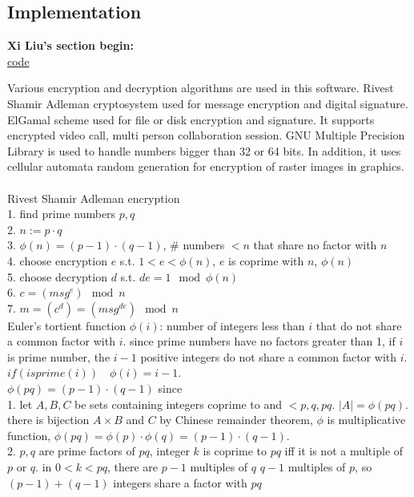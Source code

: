 \documentclass[12pt, border = 4pt, multi]{article} %
\begin{document}
\subsection*{Implementation}
\textbf{Xi Liu's section begin:}\\
\href{https://github.com/xi-liu-cs/2022-summer/tree/main/cryptography/hw/6}{code}
\begin{multicols}{2}
\noindent 
Various encryption and decryption algorithms are used in this software. Rivest Shamir Adleman cryptosystem used for message encryption and digital signature. ElGamal scheme used for file or disk encryption and signature. It supports encrypted video call, multi person collaboration session. GNU Multiple Precision Library is used to handle numbers bigger than 32 or 64 bits. In addition, it uses cellular automata random generation for encryption of raster images in graphics.\\
\\
Rivest Shamir Adleman encryption\\
1. find prime numbers $p, q$\\
2. $n := p \cdot q$\\
3. $\phi(n) = (p - 1) \cdot (q - 1)$, \# numbers $< n$ that share no factor with $n$\\
4. choose encryption $e$ s.t. $1 < e < \phi(n)$, $e$ is coprime with $n$, $\phi(n)$\\
5. choose decryption $d$ s.t. $de = 1 \mod \phi(n)$\\
6. $c = (msg ^ e) \mod n$\\
7. $m = (c ^ d) = (msg ^ {de}) \mod n$\\
Euler's tortient function $\phi(i)$: number of integers less than $i$ that do not share a common factor with $i$. since prime numbers have no factors greater than 1,
if $i$ is prime number, the $i - 1$ positive integers do not share a common factor with $i$. $if(isprime(i))\quad\phi(i) = i - 1$.\\
$\phi(pq) = (p - 1) \cdot (q - 1)$ since\\ 
1. let $A, B, C$ be sets containing integers coprime to and $< p, q, pq$. $|A| =
\phi(pq)$. there is bijection $A \times B$ and $C$ by Chinese remainder theorem, $\phi$ is multiplicative function, $\phi(pq) = \phi(p) \cdot \phi(q) = (p - 1) \cdot (q - 1)$.\\
2. $p, q$ are prime factors of $pq$, integer $k$ is coprime to $pq$ iff it is not a
multiple of $p$ or $q$. in $0 < k < pq$, there are $p - 1$ multiples of $q$
$q - 1$ multiples of $p$, so $(p - 1) + (q - 1)$ integers share a factor with $pq$

\end{multicols}
\end{document}
